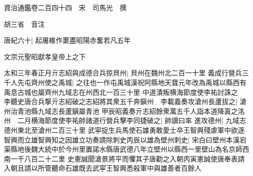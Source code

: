 資治通鑑卷二百四十四　宋　司馬光　撰

胡三省　音注

唐紀六十|{
	起屠維作噩盡昭陽赤奮若凡五年}


文宗元聖昭獻孝皇帝上之下

太和三年春正月亓志紹與成德合兵掠貝州|{
	貝州在魏州北二百一十里}
義成行營兵三千人先屯齊州使之禹城|{
	之往也一作屯禹城漢祝阿縣地天寶元年改為禹城以縣西有禹息古城也屬齊州九域志在州西北一百三十里}
中道潰叛横海節度使李祐討誅之　李聽史唐合兵撃亓志紹破之志紹將其衆五千奔鎭州　李載義奏攻滄州長蘆拔之|{
	滄州治青池縣九域志長蘆鎭屬青池}
甲辰昭義奏亓志紹餘衆萬五千人詣本道降寘之洺州　二月横海節度使李祐帥諸道行營兵擊李同捷破之|{
	帥讀曰率}
進攻德州|{
	九域志德州東北至滄州二百三十里}
武寜捉生兵馬使石雄勇敢愛士卒王智興殘虐軍中欲逐智興而立雄智興知之因雄立功奏請除刺史丙辰以雄為壁州刺史|{
	宋白曰壁州本漢宕渠縣地後魏大統中於今州里置諾水縣唐武德八年立壁州以縣西一里壁山為名京師西南一千八百二十二里}
史憲誠聞滄景將平而懼其子唐勸之入朝丙寅憲誠使唐奉表請入朝且請以所管聽命石雄既去武寜王智興悉殺軍中與雄善者百餘人

